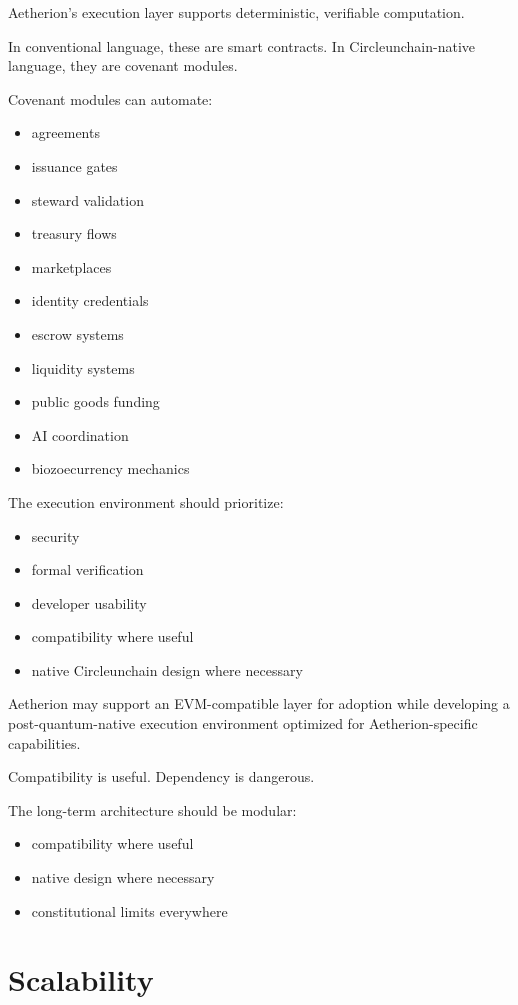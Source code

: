 ﻿\documentclass[12pt]{article}
\begin{document}
Aetherion's execution layer supports deterministic, verifiable computation.

In conventional language, these are smart contracts. In Circleunchain-native language, they are covenant modules.

Covenant modules can automate:

\begin{itemize}
  \item agreements
  \item issuance gates
  \item steward validation
  \item treasury flows
  \item marketplaces
  \item identity credentials
  \item escrow systems
  \item liquidity systems
  \item public goods funding
  \item AI coordination
  \item biozoecurrency mechanics
\end{itemize}

The execution environment should prioritize:

\begin{itemize}
  \item security
  \item formal verification
  \item developer usability
  \item compatibility where useful
  \item native Circleunchain design where necessary
\end{itemize}

Aetherion may support an EVM-compatible layer for adoption while developing a post-quantum-native execution environment optimized for Aetherion-specific capabilities.

Compatibility is useful. Dependency is dangerous.

The long-term architecture should be modular:

\begin{itemize}
  \item compatibility where useful
  \item native design where necessary
  \item constitutional limits everywhere
\end{itemize}

\section{Scalability}
\end{document}
